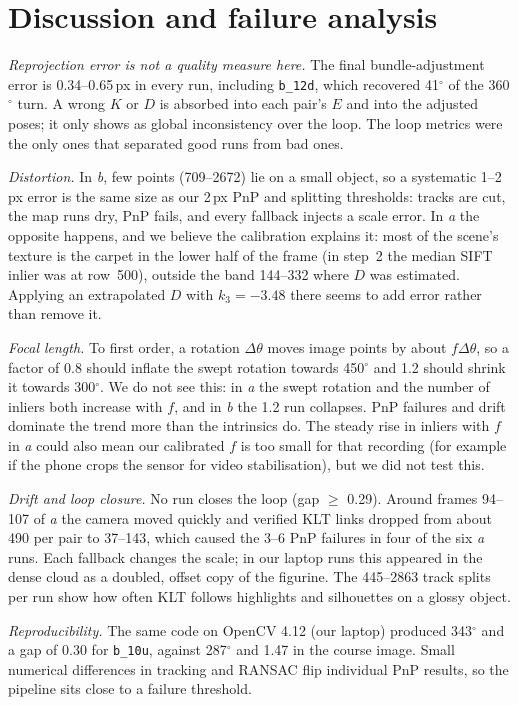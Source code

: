 \documentclass[conference]{assets/latex/IEEEtran}
\begin{document}
\section{Discussion and failure analysis}

\textit{Reprojection error is not a quality measure here.} The final bundle-adjustment error is
0.34--0.65\,px in every run, including \texttt{b\_12d}, which recovered 41$^\circ$ of the
360$^\circ$ turn. A wrong $K$ or $D$ is absorbed into each pair's $E$ and into the adjusted poses;
it only shows as global inconsistency over the loop. The loop metrics were the only ones that
separated good runs from bad ones.

\textit{Distortion.} In \textit{b}, few points (709--2672) lie on a small object, so a systematic
1--2\,px error is the same size as our 2\,px PnP and splitting thresholds: tracks are cut, the map
runs dry, PnP fails, and every fallback injects a scale error. In \textit{a} the opposite happens,
and we believe the calibration explains it: most of the scene's texture is the carpet in the lower
half of the frame (in step~2 the median SIFT inlier was at row~500), outside the band 144--332 where
$D$ was estimated. Applying an extrapolated $D$ with $k_3=-3.48$ there seems to add error rather than
remove it.

\textit{Focal length.} To first order, a rotation $\Delta\theta$ moves image points by about
$f\Delta\theta$, so a factor of 0.8 should inflate the swept rotation towards 450$^\circ$ and 1.2
should shrink it towards 300$^\circ$. We do not see this: in \textit{a} the swept rotation and the
number of inliers both increase with $f$, and in \textit{b} the 1.2 run collapses. PnP failures and
drift dominate the trend more than the intrinsics do. The steady rise in inliers with $f$ in
\textit{a} could also mean our calibrated $f$ is too small for that recording (for example if the
phone crops the sensor for video stabilisation), but we did not test this.

\textit{Drift and loop closure.} No run closes the loop (gap $\geq$ 0.29). Around frames 94--107 of
\textit{a} the camera moved quickly and verified KLT links dropped from about 490 per pair to 37--143,
which caused the 3--6 PnP failures in four of the six \textit{a} runs. Each fallback changes the
scale; in our laptop runs this appeared in the dense cloud as a doubled, offset copy of the figurine. The 445--2863 track splits per
run show how often KLT follows highlights and silhouettes on a glossy object.

\textit{Reproducibility.} The same code on OpenCV 4.12 (our laptop) produced 343$^\circ$ and a gap
of 0.30 for \texttt{b\_10u}, against 287$^\circ$ and 1.47 in the course image. Small numerical
differences in tracking and RANSAC flip individual PnP results, so the pipeline sits close to a
failure threshold.
\end{document}
